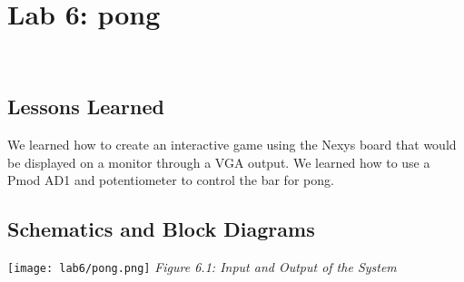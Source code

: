 \chapter{Lab 6: pong } \\
\label{Introduction}

\section{Lessons Learned}
    We learned how to create an interactive game using the Nexys board that would be displayed on a monitor through a VGA output.  We learned how to use a Pmod AD1 and potentiometer to control the bar for pong.

\label{Section::Lessons Learned}
    \section{Schematics and Block Diagrams}
        \texttt{[image: lab6/pong.png]}
        \emph{Figure 6.1: Input and Output of the System}

